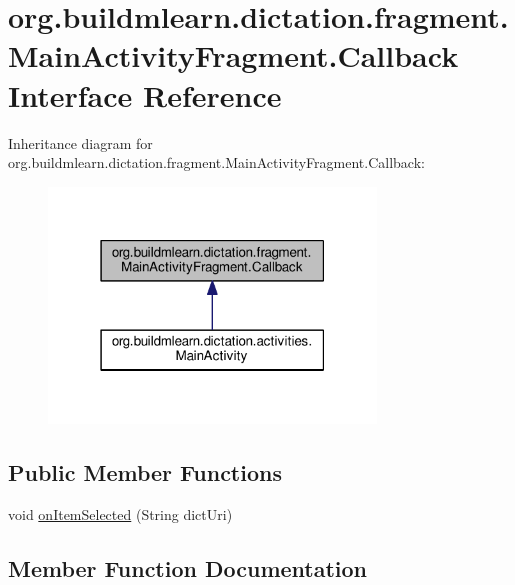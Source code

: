 \hypertarget{interfaceorg_1_1buildmlearn_1_1dictation_1_1fragment_1_1MainActivityFragment_1_1Callback}{}\section{org.\+buildmlearn.\+dictation.\+fragment.\+Main\+Activity\+Fragment.\+Callback Interface Reference}
\label{interfaceorg_1_1buildmlearn_1_1dictation_1_1fragment_1_1MainActivityFragment_1_1Callback}


Inheritance diagram for org.\+buildmlearn.\+dictation.\+fragment.\+Main\+Activity\+Fragment.\+Callback\+:
\nopagebreak
\begin{figure}[H]
\begin{center}
\leavevmode
\includegraphics[width=247pt]{interfaceorg_1_1buildmlearn_1_1dictation_1_1fragment_1_1MainActivityFragment_1_1Callback__inherit__graph}
\end{center}
\end{figure}
\subsection*{Public Member Functions}
\begin{DoxyCompactItemize}
\item 
void \hyperlink{interfaceorg_1_1buildmlearn_1_1dictation_1_1fragment_1_1MainActivityFragment_1_1Callback_a84ccfbcd573f775798c80863e44c06b5}{on\+Item\+Selected} (String dict\+Uri)
\end{DoxyCompactItemize}


\subsection{Member Function Documentation}
